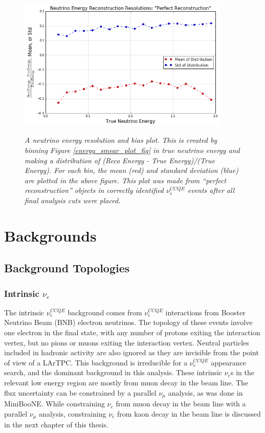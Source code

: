 \begin{figure}[ht!]
\centering
\includegraphics[width=0.9\textwidth]{Figures/LEE_EnergyRes_WithAnalysisCuts.png}\\%
\caption{\textit{A neutrino energy resolution and bias plot. This is created by binning Figure \ref{energy_smear_plot_fig} in true neutrino energy and making a distribution of (Reco Energy - True Energy)/(True Energy). For each bin, the mean (red) and standard deviation (blue) are plotted in the above figure. This plot was made from ``perfect reconstruction'' objects in correctly identified $\nu_e^{CCQE}$ events after all final analysis cuts were placed.}}
\label{energy_res_plot_fig}
\end{figure}

\section{Backgrounds}

\subsection{Background Topologies}\label{LEEbackgroundtopologiessection}

\subsubsection{Intrinsic $\nu_e$}
The intrinsic $\nu_e^{CCQE}$ background comes from $\nu_e^{CCQE}$ interactions from Booster Neutrino Beam (BNB) electron neutrinos. The topology of these events involve one electron in the final state, with any number of protons exiting the interaction vertex, but no pions or muons exiting the interaction vertex. Neutral particles included in hadronic activity are also ignored as they are invisible from the point of view of a LArTPC. This background is irreducible for a $\nu_e^{CCQE}$ appearance search, and the dominant background in this analysis. These intrinsic $\nu_e$s in the relevant low energy region are mostly from muon decay in the beam line. The flux uncertainty can be constrained by a parallel $\nu_\mu$ analysis, as was done in MiniBooNE. While constraining $\nu_e$ from muon decay in the beam line with a parallel $\nu_\mu$ analysis, constraining $\nu_e$ from kaon decay in the beam line is discussed in the next chapter of this thesis.

